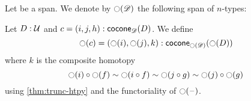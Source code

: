 \documentclass[hott-all.tex]{subfiles}
\begin{document}
% 
% 
% 
\begin{defn}
  Let
  be a span. We denote by $\ocircle(\mathscr{D})$ the following
  span of $n$-types:
\end{defn}
% 
\begin{defn}
  Let $D:\mathcal{U}$ and $c=(i,j,h):\mathsf{cocone}_{\mathscr{D}}(D)$.
  We define
  \[\ocircle(c)=(\ocircle(i),\ocircle(j),k):
  \mathsf{cocone}_{\ocircle(\mathscr{D})}(\ocircle(D))\]
  where $k$ is the composite homotopy
  \[ \ocircle(i) \circ \ocircle(f) \sim \ocircle(i\circ f) \sim \ocircle(j\circ g) \sim \ocircle(j) \circ \ocircle(g) \]
  using \cref{thm:trunc-htpy} and the functoriality of $\ocircle(\mathord{\hspace{1pt}\text{--}\hspace{1pt}})$.
\end{defn}
% 
% 
% 
% 
% 
\end{document}
